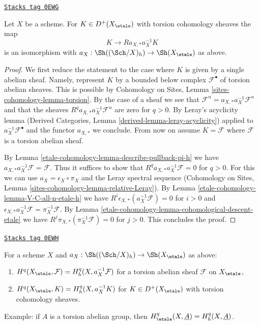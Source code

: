 \begin{lemma}
\label{etale-cohomology-lemma-cohomological-descent-etale-h}
\href{https://stacks.math.columbia.edu/tag/0EWG}{\texttt{Stacks tag 0EWG}}

Let $X$ be a scheme. For $K \in D^+(X_\etale)$ with torsion cohomology
sheaves the map
$$
K \longrightarrow Ra_{X, *}a_X^{-1}K
$$
is an isomorphism with $a_X : \Sh((\Sch/X)_h) \to \Sh(X_\etale)$ as above.
\end{lemma}

\begin{proof}
We first reduce the statement to the case where
$K$ is given by a single abelian sheaf. Namely, represent $K$
by a bounded below complex $\mathcal{F}^\bullet$ of torsion
abelian sheaves. This is possible by Cohomology on Sites, Lemma
\ref{sites-cohomology-lemma-torsion}. By the case of a
sheaf we see that
$\mathcal{F}^n = a_{X, *} a_X^{-1} \mathcal{F}^n$
and that the sheaves $R^qa_{X, *}a_X^{-1}\mathcal{F}^n$
are zero for $q > 0$. By Leray's acyclicity lemma
(Derived Categories, Lemma \ref{derived-lemma-leray-acyclicity})
applied to $a_X^{-1}\mathcal{F}^\bullet$
and the functor $a_{X, *}$ we conclude. From now on assume $K = \mathcal{F}$
where $\mathcal{F}$ is a torsion abelian sheaf.

\medskip\noindent
By Lemma \ref{etale-cohomology-lemma-describe-pullback-pi-h} we have
$a_{X, *}a_X^{-1}\mathcal{F} = \mathcal{F}$. Thus it suffices to show that
$R^qa_{X, *}a_X^{-1}\mathcal{F} = 0$ for $q > 0$.
For this we can use $a_X = \epsilon_X \circ \pi_X$ and
the Leray spectral sequence
(Cohomology on Sites, Lemma \ref{sites-cohomology-lemma-relative-Leray}).
By Lemma \ref{etale-cohomology-lemma-V-C-all-n-etale-h}
we have $R^i\epsilon_{X, *}(a_X^{-1}\mathcal{F}) = 0$ for $i > 0$
and $\epsilon_{X, *}a_X^{-1}\mathcal{F} = \pi_X^{-1}\mathcal{F}$.
By Lemma \ref{etale-cohomology-lemma-cohomological-descent-etale} we have
$R^j\pi_{X, *}(\pi_X^{-1}\mathcal{F}) = 0$ for $j > 0$.
This concludes the proof.
\end{proof}

\begin{lemma}
\label{etale-cohomology-lemma-compare-cohomology-etale-h}
\href{https://stacks.math.columbia.edu/tag/0EWH}{\texttt{Stacks tag 0EWH}}

For a scheme $X$ and $a_X : \Sh((\Sch/X)_h) \to \Sh(X_\etale)$
as above:
\begin{enumerate}
\item $H^q(X_\etale, \mathcal{F}) = H^q_h(X, a_X^{-1}\mathcal{F})$
for a torsion abelian sheaf $\mathcal{F}$ on $X_\etale$,
\item $H^q(X_\etale, K) = H^q_h(X, a_X^{-1}K)$
for $K \in D^+(X_\etale)$ with torsion cohomology sheaves.
\end{enumerate}
Example: if $A$ is a torsion abelian group, then
$H^q_\etale(X, \underline{A}) = H^q_h(X, \underline{A})$.
\end{lemma}

